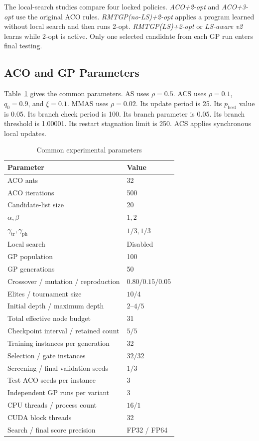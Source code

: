 \documentclass[letterpaper,journal]{IEEEtran}
\begin{document}
The local-search studies compare four locked policies.
\emph{ACO+2-opt} and \emph{ACO+3-opt} use the original ACO rules.
\emph{RMTGP(no-LS)+2-opt} applies a program learned without local search and
then runs 2-opt.
\emph{RMTGP(LS)+2-opt} or \emph{LS-aware v2} learns while 2-opt is active.
Only one selected candidate from each GP run enters final testing.

\subsection{ACO and GP Parameters}

Table~\ref{tab:parameters} gives the common parameters.
AS uses \(\rho=0.5\).
ACS uses \(\rho=0.1\), \(q_0=0.9\), and \(\xi=0.1\).
MMAS uses \(\rho=0.02\).
Its update period is 25.
Its \(p_{\mathrm{best}}\) value is 0.05.
Its branch check period is 100.
Its branch parameter is 0.05.
Its branch threshold is 1.00001.
Its restart stagnation limit is 250.
ACS applies synchronous local updates.

\begin{table}[t]
\caption{Common experimental parameters}
\label{tab:parameters}
\centering
\footnotesize
\begin{tabular}{ll}
\toprule
Parameter & Value\\
\midrule
ACO ants & 32\\
ACO iterations & 500\\
Candidate-list size & 20\\
\(\alpha,\beta\) & \(1,2\)\\
\(\gamma_{\mathrm{tr}},\gamma_{\mathrm{ph}}\) & \(1/3,1/3\)\\
Local search & Disabled\\
GP population & 100\\
GP generations & 50\\
Crossover / mutation / reproduction & \(0.80/0.15/0.05\)\\
Elites / tournament size & \(10/4\)\\
Initial depth / maximum depth & \(2\)--\(4/5\)\\
Total effective node budget & 31\\
Checkpoint interval / retained count & \(5/5\)\\
Training instances per generation & 32\\
Selection / gate instances & \(32/32\)\\
Screening / final validation seeds & \(1/3\)\\
Test ACO seeds per instance & 3\\
Independent GP runs per variant & 3\\
CPU threads / process count & \(16/1\)\\
CUDA block threads & 32\\
Search / final score precision & FP32 / FP64\\
\bottomrule
\end{tabular}
\end{table}
\end{document}
